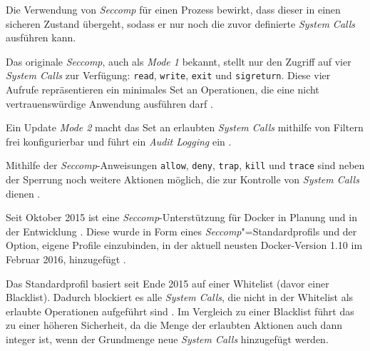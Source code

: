 \documentclass[../main.tex]{subfiles}
\begin{document}
			Die Verwendung von \emph{Seccomp} für einen Prozess bewirkt, dass dieser in einen \glqq{}sicheren\grqq{} Zustand übergeht, sodass er nur noch die zuvor definierte \emph{System Calls} ausführen kann.



			Das originale \emph{Seccomp}, auch als \emph{Mode 1} bekannt, stellt nur den Zugriff auf vier \emph{System Calls} zur Verfügung: \texttt{read}, \texttt{write}, \texttt{exit} und \texttt{sigreturn}. Diese vier Aufrufe repräsentieren ein minimales Set an Operationen, die eine nicht vertrauenswürdige Anwendung ausführen darf \cite{linuxSecOverview}.

			Ein Update \emph{Mode 2} macht das Set an erlaubten \emph{System Calls} mithilfe von Filtern frei konfigurierbar und führt ein \emph{Audit Logging} ein	\cite{linuxSecOverview}\cite{seccompGitDesc}.

			Mithilfe der \emph{Seccomp}-Anweisungen \texttt{allow}, \texttt{deny}, \texttt{trap}, \texttt{kill} und \texttt{trace} sind neben der Sperrung noch weitere Aktionen möglich, die zur Kontrolle von \emph{System Calls} dienen \cite{docker110Security}.

			Seit Oktober 2015 ist eine \emph{Seccomp}-Unterstützung für Docker in Planung und in der Entwicklung \cite{githubGeneralSecProfiles}\cite{githubSeccompIntegration}. Diese wurde in Form eines \emph{Seccomp}"=Standardprofils und der Option, eigene Profile einzubinden, in der aktuell neusten Docker-Version 1.10 im Februar 2016, hinzugefügt \cite{githubDockerChangelog}\cite{githubSeccompProfile}\cite{githubSeccompDoc}\cite{docker110Security}.

			Das Standardprofil basiert seit Ende 2015 auf einer Whitelist (davor einer Blacklist). Dadurch blockiert es alle \emph{System Calls}, die nicht in der Whitelist als erlaubte Operationen aufgeführt sind \cite{githubSeccompDoc}. Im Vergleich zu einer Blacklist führt das zu einer höheren Sicherheit, da die Menge der erlaubten Aktionen auch dann integer ist, wenn der Grundmenge neue \emph{System Calls} hinzugefügt werden.
\end{document}
